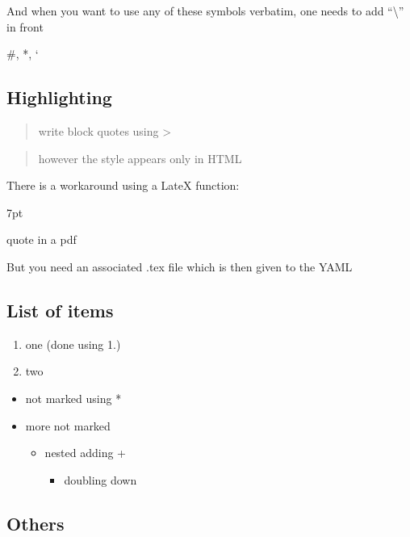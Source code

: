 \documentclass[
  11pt,
]{article}
\providecommand{\tightlist}{%
  \setlength{\itemsep}{0pt}\setlength{\parskip}{0pt}}
\newenvironment{formal}{%
  \def\FrameCommand{%
    \hspace{1pt}%
    {\color{gray}\vrule width 2pt}%
    {\color{white}\vrule width 4pt}%
    \colorbox{white}%
  }%
  \MakeFramed{\advance\hsize-\width\FrameRestore}%
  \noindent\hspace{-4.55pt}%
  \begin{adjustwidth}{}{7pt}%
  \vspace{2pt}\vspace{2pt}%
}
{%
  \vspace{2pt}\end{adjustwidth}\endMakeFramed%
}
\begin{document}
And when you want to use any of these symbols verbatim, one needs to add ``\textbackslash{}'' in front

\#, *, `

\hypertarget{highlighting}{%
\subsection{Highlighting}\label{highlighting}}

\begin{quote}
write block quotes using \textgreater{}
\end{quote}

\begin{quote}
however the style appears only in HTML
\end{quote}

There is a workaround using a LateX function:

\begin{formal}
  quote in a pdf
\end{formal}

But you need an associated .tex file which is then given to the YAML

\hypertarget{list-of-items}{%
\subsection{List of items}\label{list-of-items}}

\begin{enumerate}
\def\labelenumi{\arabic{enumi}.}
\item
  one (done using 1.)
\item
  two
\end{enumerate}

\begin{itemize}
\item
  not marked using *
\item
  more not marked

  \begin{itemize}
  \item
    nested adding +

    \begin{itemize}
    \tightlist
    \item
      doubling down
    \end{itemize}
  \end{itemize}
\end{itemize}

\hypertarget{others}{%
\subsection{Others}\label{others}}
\end{document}
